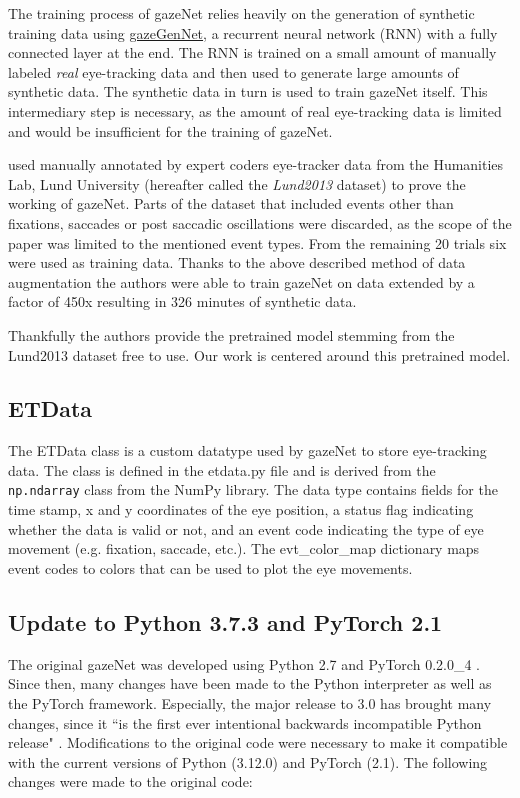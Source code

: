 \documentclass[conference]{IEEEtran}
\begin{document}
The training process of gazeNet relies heavily on the generation of synthetic training data using \href{https://github.com/r-zemblys/gazeGenNet}{gazeGenNet}, a recurrent neural network (RNN) with a fully connected layer at the end. The RNN is trained on a small amount of manually labeled \emph{real} eye-tracking data and then used to generate large amounts of synthetic data. The synthetic data in turn is used to train gazeNet itself. This intermediary step is necessary, as the amount of real eye-tracking data is limited and would be insufficient for the training of gazeNet. \cite{zemblys2018gazeNet}

\cite{zemblys2018gazeNet} used manually annotated by expert coders eye-tracker data from the Humanities Lab, Lund University (hereafter called the \emph{Lund2013} dataset) to prove the working of gazeNet. Parts of the dataset that included events other than fixations, saccades or post saccadic oscillations were discarded, as the scope of the paper was limited to the mentioned event types. From the remaining 20 trials six were used as training data. Thanks to the above described method of data augmentation the authors were able to train gazeNet on data extended by a factor of 450x resulting in 326 minutes of synthetic data.

Thankfully the authors provide the pretrained model stemming from the Lund2013 dataset free to use. Our work is centered around this pretrained model.

\subsection{ETData}
The ETData class is a custom datatype used by gazeNet to store eye-tracking data. The class is defined in the etdata.py file and is derived from the \verb|np.ndarray| class from the NumPy library. The data type contains fields for the time stamp, x and y coordinates of the eye position, a status flag indicating whether the data is valid or not, and an event code indicating the type of eye movement (e.g. fixation, saccade, etc.). The evt\_color\_map dictionary maps event codes to colors that can be used to plot the eye movements.


\subsection{Update to Python 3.7.3 and PyTorch 2.1}
The original gazeNet was developed using Python 2.7 and PyTorch 0.2.0\_4 \cite{zemblys2018gazeNet}. Since then, many changes have been made to the Python interpreter as well as the PyTorch framework. Especially, the major release to 3.0 has brought many changes, since it ``is the first ever intentional backwards incompatible Python release" \cite{van_Rossum_2009}. Modifications to the original code were necessary to make it compatible with the current versions of Python (3.12.0) and PyTorch (2.1). The following changes were made to the original code:
\end{document}
